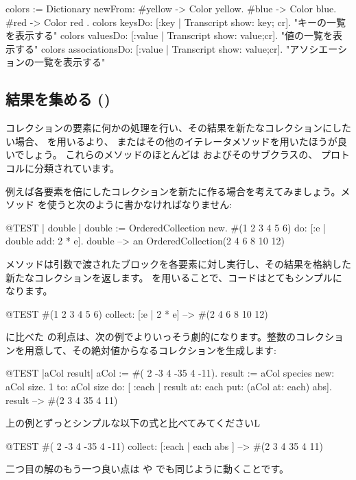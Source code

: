 \documentclass[a4paper,10pt,twoside]{book}
\begin{document}
\begin{code}{}
colors := Dictionary newFrom: { #yellow -> Color yellow. #blue -> Color blue. #red -> Color red }.
colors keysDo: [:key | Transcript show: key; cr].                    "キーの一覧を表示する"
colors valuesDo: [:value | Transcript show: value;cr].            "値の一覧を表示する"
colors associationsDo: [:value | Transcript show: value;cr].  "アソシエーションの一覧を表示する"
\end{code}

\subsection{結果を集める ()}
コレクションの要素に何かの処理を行い、その結果を新たなコレクションにしたい場合、 を用いるより、 またはその他のイテレータメソッドを用いたほうが良いでしょう。
これらのメソッドのほとんどは  およびそのサブクラスの、 プロトコルに分類されています。

例えば各要素を倍にしたコレクションを新たに作る場合を考えてみましょう。メソッド  を使うと次のように書かなければなりません:

\begin{code}{@TEST | double |}
double := OrderedCollection new.
#(1 2 3 4 5 6) do: [:e | double add: 2 * e].
double --> an OrderedCollection(2 4 6 8 10 12)
\end{code}

\noindent
{} メソッドは引数で渡されたブロックを各要素に対し実行し、その結果を格納した新たなコレクションを返します。
 を用いることで、コードはとてもシンプルになります。
\begin{code}{@TEST}
#(1 2 3 4 5 6) collect: [:e | 2 * e] --> #(2 4 6 8 10 12)
\end{code}

 に比べた  の利点は、次の例でよりいっそう劇的になります。整数のコレクションを用意して、その絶対値からなるコレクションを生成します:

\begin{code}{@TEST |aCol result|}
aCol :=  #( 2 -3 4 -35 4 -11).
result := aCol species new: aCol size.
1 to: aCol size do: [ :each | result at: each put: (aCol at: each) abs].
result --> #(2 3 4 35 4 11)
\end{code}
\noindent
上の例とずっとシンプルな以下の式と比べてみてくださいL
\begin{code}{@TEST}
#( 2 -3 4 -35 4 -11) collect: [:each | each abs ] --> #(2 3 4 35 4 11)
\end{code}
\noindent
二つ目の解のもう一つ良い点は  や  でも同じように動くことです。
\end{document}
